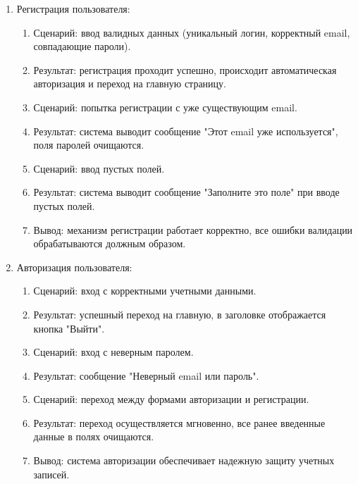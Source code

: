 \begin{enumerate}
\item Регистрация пользователя:
    \begin{enumerate}
     \item Сценарий: ввод валидных данных (уникальный логин, корректный email, совпадающие пароли).
     
     \item Результат: регистрация проходит успешно, происходит автоматическая авторизация и переход на главную страницу.
     
     \item Сценарий: попытка регистрации с уже существующим email.

     \item Результат: система выводит сообщение "Этот email уже используется", поля паролей очищаются.

     \item Сценарий: ввод пустых полей.

     \item Результат: система выводит сообщение "Заполните это поле" при вводе пустых полей.

     \item Вывод: механизм регистрации работает корректно, все ошибки валидации обрабатываются должным образом.
    \end{enumerate}

\item Авторизация пользователя:
    \begin{enumerate}
     \item Сценарий: вход с корректными учетными данными.
     
     \item Результат: успешный переход на главную, в заголовке отображается кнопка "Выйти".
     
     \item Сценарий: вход с неверным паролем.

     \item Результат: сообщение "Неверный email или пароль".

     \item Сценарий: переход между формами авторизации и регистрации.

     \item Результат: переход осуществляется мгновенно, все ранее введенные данные в полях очищаются.

     \item Вывод: система авторизации обеспечивает надежную защиту учетных записей.
    \end{enumerate}


\end{enumerate}

